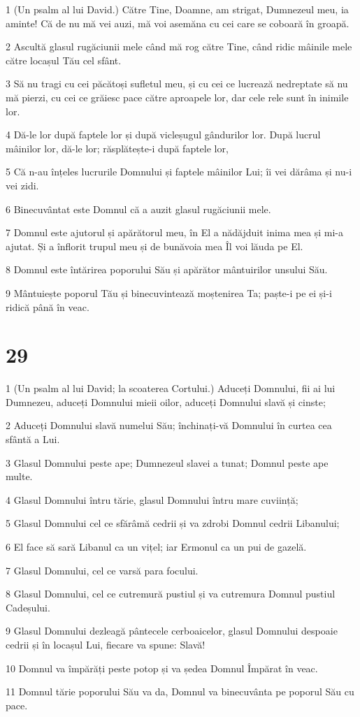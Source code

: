 \par 1 (Un psalm al lui David.) Către Tine, Doamne, am strigat, Dumnezeul meu, ia aminte! Că de nu mă vei auzi, mă voi asemăna cu cei care se coboară în groapă.
\par 2 Ascultă glasul rugăciunii mele când mă rog către Tine, când ridic mâinile mele către locașul Tău cel sfânt.
\par 3 Să nu tragi cu cei păcătoși sufletul meu, și cu cei ce lucrează nedreptate să nu mă pierzi, cu cei ce grăiesc pace către aproapele lor, dar cele rele sunt în inimile lor.
\par 4 Dă-le lor după faptele lor și după vicleșugul gândurilor lor. După lucrul mâinilor lor, dă-le lor; răsplătește-i după faptele lor,
\par 5 Că n-au înțeles lucrurile Domnului și faptele mâinilor Lui; îi vei dărâma și nu-i vei zidi.
\par 6 Binecuvântat este Domnul că a auzit glasul rugăciunii mele.
\par 7 Domnul este ajutorul și apărătorul meu, în El a nădăjduit inima mea și mi-a ajutat. Și a înflorit trupul meu și de bunăvoia mea Îl voi lăuda pe El.
\par 8 Domnul este întărirea poporului Său și apărător mântuirilor unsului Său.
\par 9 Mântuiește poporul Tău și binecuvintează moștenirea Ta; paște-i pe ei și-i ridică până în veac.

\chapter{29}

\par 1 (Un psalm al lui David; la scoaterea Cortului.) Aduceți Domnului, fii ai lui Dumnezeu, aduceți Domnului mieii oilor, aduceți Domnului slavă și cinste;
\par 2 Aduceți Domnului slavă numelui Său; închinați-vă Domnului în curtea cea sfântă a Lui.
\par 3 Glasul Domnului peste ape; Dumnezeul slavei a tunat; Domnul peste ape multe.
\par 4 Glasul Domnului întru tărie, glasul Domnului întru mare cuviință;
\par 5 Glasul Domnului cel ce sfărâmă cedrii și va zdrobi Domnul cedrii Libanului;
\par 6 El face să sară Libanul ca un vițel; iar Ermonul ca un pui de gazelă.
\par 7 Glasul Domnului, cel ce varsă para focului.
\par 8 Glasul Domnului, cel ce cutremură pustiul și va cutremura Domnul pustiul Cadeșului.
\par 9 Glasul Domnului dezleagă pântecele cerboaicelor, glasul Domnului despoaie cedrii și în locașul Lui, fiecare va spune: Slavă!
\par 10 Domnul va împărăți peste potop și va ședea Domnul Împărat în veac.
\par 11 Domnul tărie poporului Său va da, Domnul va binecuvânta pe poporul Său cu pace.

